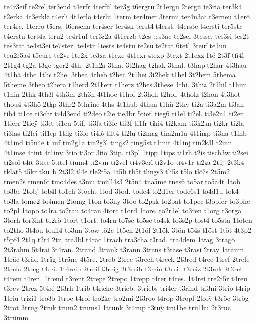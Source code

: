 {te4r3eif
te2rel
ter3end
t4erfr
4terfül
ter3g
t6ergru
2t1ergu
2tergü
te3ria
ter3k4
t2erka
4t3erklä
t4erli
4t1erlö
t4erlu
1term
ter4mer
3termi
ter4n3ar
t3erneu
t1erö
ter4re.
1terro
t6ers.
t6erscha
ter4ser
ter4sk
terst4
t4erst.
t4erste
t4ersti
ter5str
t4erstu
tert4a
teru2
te4r1uf
ter3z2a
4t1erzb
t2es
tes3ac
te2sel
3tesse.
tes3si
tes2t
tes3tät
te4st3ei
te7ster.
te4str
1tests
te4stu
te2su
te2tat
6tetl
3teuf
te1un
teu2r5a4
t5euro
te2vi
1te2x
te3xa
t1exe
4t1exi
4texp
3text
2t1exz
1té
2t3f
tfi4l
2t1g4
tg2a
t3ge
tger2
4th.
2t1h2a
3tha.
3t2hag
t2hak
3thal.
t3hap
t2har
4t3hau
4t1hä
4thc
1the
t2he.
3thea
4theb
t2hec
2t1hei
3t2hek
t1hel
3t2hem
5thema
5theme
3theo
t2hera
t1herd
2t1herr
t1herz
t2hes
3these
1thi.
3thia
2t1hil
t1him
t1hin
2thk
4th3l
4th3m
2th3n
4t1hoc
t1hof
2t3hoh
t2hol.
4tholz
t2hon
4t3hot
thou4
4t3hö
2thp
3thr2
5thrine
4ths
4t1hub
4thun
t1hü
2thv
ti2a
ti3a2m
ti3an
tib4
ti1ce
ti3chr
ti4d3end
ti2deo
t2ie
tie3br
5tief.
tieg6
ti1el
ti2el.
ti3e2n1
ti2er
1tierr
2tie^^ff
ti3et
ti1eu
5tif.
ti3fa
ti3fe
tif3f
ti1fr
tihi4
ti2kam
ti3k2an
ti2kr
ti2la
ti3las
ti2lei
til1ep
1tilg
ti3lo
ti4lö
tilt4
ti2lu
ti2mag
tim2m1a
4t1imp
ti3na
t1inb
4t1ind
ti5n4e
t1inf
tin2g1a
tin2g3l
tings2
ting5st
t1init
4t1inj
tin2k3l
t2inn
4t1inse
4tint
4t1inv
3tio
ti3or
3tiö
3tip.
ti3pl
1tipp
1tips
ti1rh
t2is
tisch3w
ti2sei
ti2sol
t4it
3tite
5titel
tium4
ti2van
ti2vel
ti4v3erl
ti2v1o
ti4v1r
ti2za
2t1j
2t3k4
tklat5
t5kr
tkü1b
2t3l2
tl4e
tle2r5a
4t5li
tli5f
tlings3
tli5s
t5lo
tlö3s
2t5m2
tmen2s
tmen6t
tmo4des
t3mu
tmüll4s3
2t5n4
tna5me
tnes6
to5ar
to5a4t
1tob
to3be
2tobj
tob4l
to1ch
3tocht
1tod
3tod.
tode4
to2d1er
tode6s1
to4d1u
tok4
to3la
tome2
to4men
2tomg
1ton
to3ny
3too
to2pak
to2pat
to1pec
t3opfer
to3phe
to2pl
1topo
to1ra
to2rau
to4rän
4torc
t1ord
1tore.
to2r1el
to3ren
t1org
t3orga
3torh
tor3int
to2rö
1tort
t1ort.
to4ru
to7sc
to5se
to4sk
to3s2p
tost4
to5sta
1toten
to2tho
3t4ou
touil4
to3un
3tow
tö2c
1töch
2t1öf
2t1ök
3tön
tö4s
t1öst
1töt
4t3p2
t5pf4
2t1q
t2r4
2tr.
tra3bl
t4rac
1trach
tra3cha
t3rad.
tra4dem
1trag
3tragö
2t3rahm
5t4rai
3t4ran.
2trand
3trank
t3rann
3trans
t3rase
t3rasi
2tra^^ff
1traum
1träc
t3räd
1träg
1träne
4t5re.
2treb
2trec
t3rech
t4reck
2t3red
t4ree
1tref
2trefe
2trefo
2treg
t4rei.
1t4reib
2treif
t3reig
2t3reih
t3rein
t3reis
t3reiz
2t3rek
2t3rel
t4rem
t4ren.
1trend
t3rent
2trepe
2trepo
1trepp
t4rer
t4res.
1t4ret
tre2t5r
t4reu
t3rev
2trez
5t4ré
2t3rh
1trib
t4riche
3trieb.
3triebs
tri4er
t3rind
tri3ni
3trio
t4rip
1triu
trizi1
tro3b
1troc
t4roi
tro2ke
tro2mi
2t3roo
t4rop
3tropf
2tro^^ff
t3röc
3trög
2tröt
3trug
2truk
trum2
trums1
1trunk
3t4rup
t3ru^^ff
trü1be
trü1bu
2t3rüc
3trümm
}
